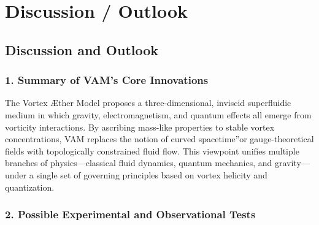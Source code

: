 \documentclass[a4paper,12pt]{article}
\begin{document}
    \section{Discussion / Outlook}

\subsection*{Discussion and Outlook}

\subsubsection*{1. Summary of VAM's Core Innovations}
The Vortex Æther Model proposes a three-dimensional, inviscid superfluidic medium in which gravity, electromagnetism, and quantum effects all emerge from vorticity interactions. By ascribing mass-like properties to stable vortex concentrations, VAM replaces the notion of \grqq curved spacetime\textquotedblright or gauge-theoretical fields with topologically constrained fluid flow. This viewpoint unifies multiple branches of physics—classical fluid dynamics, quantum mechanics, and gravity—under a single set of governing principles based on vortex helicity and quantization.

\subsubsection*{2. Possible Experimental and Observational Tests}
\end{document}
